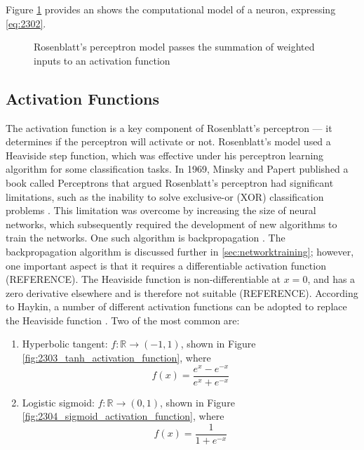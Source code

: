 Figure \ref{fig:2301_perceptron_model} provides an shows the computational model of a neuron, expressing \ref{eq:2302}.

\begin{figure}[h]
	\centering
	
	\caption[Computational model of a perceptron]{Rosenblatt's perceptron model passes the summation of weighted inputs to an activation function}
	\label{fig:2301_perceptron_model}
\end{figure}



\subsection{Activation Functions}
The activation function is a key component of Rosenblatt's perceptron --- it determines if the perceptron will activate or not. Rosenblatt's model used a Heaviside step function, which was effective under his perceptron learning algorithm for some classification tasks. In 1969, Minsky and Papert published a book called Perceptrons that argued Rosenblatt's perceptron had significant limitations, such as the inability to solve exclusive-or (XOR) classification problems \cite{Minsky1969}. This limitation was overcome by increasing the size of neural networks, which subsequently required the development of new algorithms to train the networks. One such algorithm is backpropagation \cite{Werbos1982}. The backpropagation algorithm is discussed further in \textsection \ref{sec:networktraining}; however, one important aspect is that it requires a differentiable activation function (REFERENCE). The Heaviside function is non-differentiable at $x = 0$, and has a zero derivative elsewhere and is therefore not suitable (REFERENCE). According to Haykin, a number of different activation functions can be adopted to replace the Heaviside function \cite{Haykin99}. Two of the most common are:
\begin{enumerate}
	\item Hyperbolic tangent: $f:\mathbb{R} \to (-1,1)$, shown in Figure \ref{fig:2303_tanh_activation_function}, where
	\begin{equation}
		f(x) = \frac{e^x - e^{-x}}{e^x + e^{-x}}
	\end{equation}
	\item Logistic sigmoid: $f:\mathbb{R} \to (0,1)$, shown in Figure \ref{fig:2304_sigmoid_activation_function}, where
	\begin{equation}
		f(x) = \frac{1}{1 + e^{-x}}
	\end{equation}
\end{enumerate}

